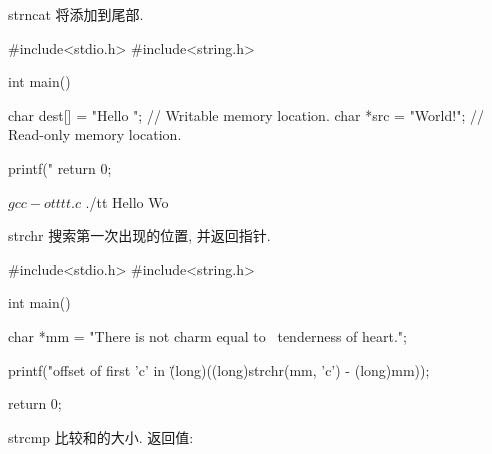 \begin{cfunc}{strncat}
将添加到尾部.
\begin{usage}
\begin{sccode}
#include<stdio.h>
#include<string.h>

int main()
{
    char dest[] = "Hello "; // Writable memory location.
    char *src = "World!\n"; // Read-only memory location.

    printf("%
    return 0;
}
\end{sccode}
\comout
\begin{sbcode}
$ gcc -o tt tt.c
$ ./tt
Hello Wo
\end{sbcode}
\end{usage}
\end{cfunc}

\begin{cfunc}{strchr}
搜索第一次出现的位置, 并返回指针.
\begin{usage}
\begin{sccode}
#include<stdio.h>
#include<string.h>

int main()
{
    char *mm = "There is not charm equal to \
tenderness of heart.";

    printf("offset of first 'c' in \"%
        (long)((long)strchr(mm, 'c') - (long)mm));

    return 0;
}
\end{sccode}
\end{usage}
\end{cfunc}

\begin{cfunc}{strcmp}
比较和的大小. 返回值: 
\begin{minipage}[c]{.4\hsize}
\end{minipage}
\end{cfunc}
